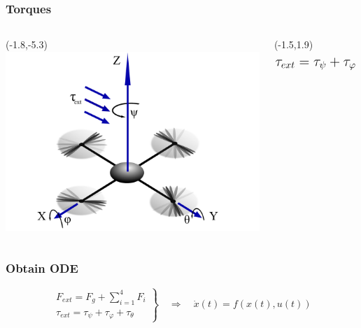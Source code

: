 \begin{frame}
		\frametitle{Torques}
			\begin{columns}[T] %
			\begin{column}{.7\textwidth}
				\begin{textblock}{0}(-1.8,-5.3)
					\includegraphics[width=11cm]{images/Copter_Text.pdf}
				\end{textblock}
			\end{column}
			\begin{column}{0.29\textwidth}
				\begin{textblock}{0}(-1.5,1.9)
					\[ \mathlarger{\mathlarger{\tau_{ext} = \tau_{\psi} +\tau_{\varphi}+\tau_{\theta}}} \]
				\end{textblock}
				\end{column}
		\end{columns}
\end{frame}

\begin{frame}
	\frametitle{Obtain ODE}
	\begin{block}{}
		\centering
		\[\left. \begin{array}{c} F_{ext} = F_{g} + \sum_{i=1}^{4}{F_{i}} \\ \tau_{ext} = \tau_{\psi} +\tau_{\varphi}+\tau_{\theta}  \end{array} \right\} \quad \Rightarrow \quad \dot{x}(t)=f(x(t),u(t)) \]
		\vspace{1ex}
	\end{block}
	
\end{frame}
